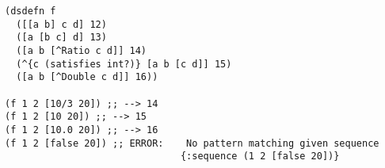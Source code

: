 \begin{lstlisting}[style=reclojureClojure,frame=single]
(dsdefn f 
  ([[a b] c d] 12)
  ([a [b c] d] 13)
  ([a b [^Ratio c d]] 14)
  (^{c (satisfies int?)} [a b [c d]] 15)
  ([a b [^Double c d]] 16))

(f 1 2 [10/3 20]) ;; --> 14
(f 1 2 [10 20]) ;; --> 15
(f 1 2 [10.0 20]) ;; --> 16
(f 1 2 [false 20]) ;; ERROR:    No pattern matching given sequence
                               {:sequence (1 2 [false 20])}
\end{lstlisting}
